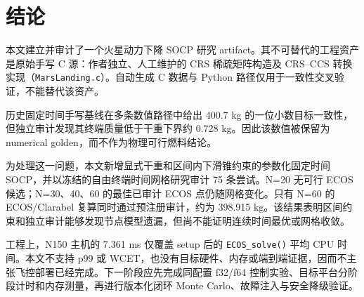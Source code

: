 \section{结论}

本文建立并审计了一个火星动力下降 SOCP 研究 artifact。其不可替代的工程资产是原始手写 C 源：作者独立、人工维护的 CRS 稀疏矩阵构造及 CRS--CCS 转换实现（\texttt{MarsLanding.c}）。自动生成 C 数据与 Python 路径仅用于一致性交叉验证，不能替代该资产。

历史固定时间手写基线在多条数值路径中给出 400.7 kg 的一位小数目标一致性，但独立审计发现其终端质量低于干重下界约 0.728 kg。因此该数值被保留为 numerical golden，而不作为物理可行燃料结论。

为处理这一问题，本文新增显式干重和区间内下滑锥约束的参数化固定时间 SOCP，并以冻结的自由终端时间网格研究审计 75 条尝试。N=20 无可行 ECOS 候选；N=30、40、60 的最佳已审计 ECOS 点仍随网格变化。只有 N=60 的 ECOS/Clarabel 复算同时通过预注册审计，约为 398.915 kg。该结果表明区间约束和独立审计能够发现节点模型遗漏，但尚不能证明连续时间最优或网格收敛。

工程上，N150 主机的 7.361 ms 仅覆盖 setup 后的 \texttt{ECOS\_solve()} 平均 CPU 时间。本文不支持 p99 或 WCET，也没有目标硬件、内存或端到端证据，因而不主张飞控部署已经完成。下一阶段应先完成同配置 f32/f64 控制实验、目标平台分阶段计时和内存测量，再进行版本化闭环 Monte Carlo、故障注入与安全降级验证。
